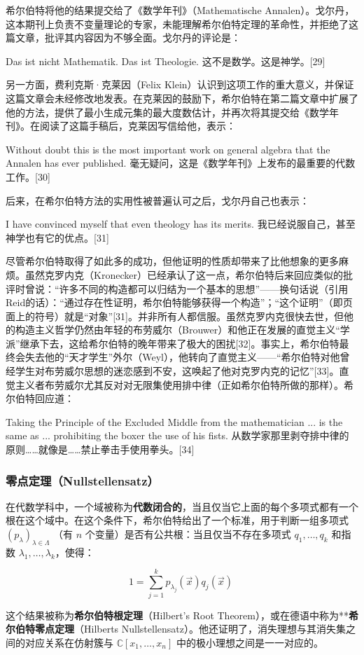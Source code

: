 希尔伯特将他的结果提交给了《数学年刊》（Mathematische Annalen）。戈尔丹，这本期刊上负责不变量理论的专家，未能理解希尔伯特定理的革命性，并拒绝了这篇文章，批评其内容因为不够全面。戈尔丹的评论是：

Das ist nicht Mathematik. Das ist Theologie.  
这不是数学。这是神学。[29]

另一方面，费利克斯·克莱因（Felix Klein）认识到这项工作的重大意义，并保证这篇文章会未经修改地发表。在克莱因的鼓励下，希尔伯特在第二篇文章中扩展了他的方法，提供了最小生成元集的最大度数估计，并再次将其提交给《数学年刊》。在阅读了这篇手稿后，克莱因写信给他，表示：

Without doubt this is the most important work on general algebra that the Annalen has ever published.  
毫无疑问，这是《数学年刊》上发布的最重要的代数工作。[30]

后来，在希尔伯特方法的实用性被普遍认可之后，戈尔丹自己也表示：

I have convinced myself that even theology has its merits. 
我已经说服自己，甚至神学也有它的优点。[31]

尽管希尔伯特取得了如此多的成功，但他证明的性质却带来了比他想象的更多麻烦。虽然克罗内克（Kronecker）已经承认了这一点，希尔伯特后来回应类似的批评时曾说：“许多不同的构造都可以归结为一个基本的思想”——换句话说（引用Reid的话）：“通过存在性证明，希尔伯特能够获得一个构造”；“这个证明”（即页面上的符号）就是“对象”[31]。并非所有人都信服。虽然克罗内克很快去世，但他的构造主义哲学仍然由年轻的布劳威尔（Brouwer）和他正在发展的直觉主义“学派”继承下去，这给希尔伯特的晚年带来了极大的困扰[32]。事实上，希尔伯特最终会失去他的“天才学生”外尔（Weyl），他转向了直觉主义——“希尔伯特对他曾经学生对布劳威尔思想的迷恋感到不安，这唤起了他对克罗内克的记忆”[33]。直觉主义者布劳威尔尤其反对对无限集使用排中律（正如希尔伯特所做的那样）。希尔伯特回应道：

Taking the Principle of the Excluded Middle from the mathematician ... is the same as ... prohibiting the boxer the use of his fists.
从数学家那里剥夺排中律的原则……就像是……禁止拳击手使用拳头。[34]
\subsubsection{零点定理（Nullstellensatz）}
在代数学科中，一个域被称为\textbf{代数闭合的}，当且仅当它上面的每个多项式都有一个根在这个域中。在这个条件下，希尔伯特给出了一个标准，用于判断一组多项式 \((p_{\lambda})_{\lambda \in \Lambda}\) （有 \(n\) 个变量）是否有公共根：当且仅当不存在多项式 \(q_1, \dots, q_k\) 和指数 \(\lambda_1, \dots, \lambda_k\)，使得：

\[
1 = \sum_{j=1}^{k} p_{\lambda_j}(\vec{x}) q_j(\vec{x})~
\]

这个结果被称为\textbf{希尔伯特根定理}（Hilbert's Root Theorem），或在德语中称为**\textbf{希尔伯特零点定理}（Hilberts Nullstellensatz）。他还证明了，消失理想与其消失集之间的对应关系在仿射簇与 \( \mathbb{C}[x_1, \dots, x_n] \) 中的极小理想之间是一一对应的。